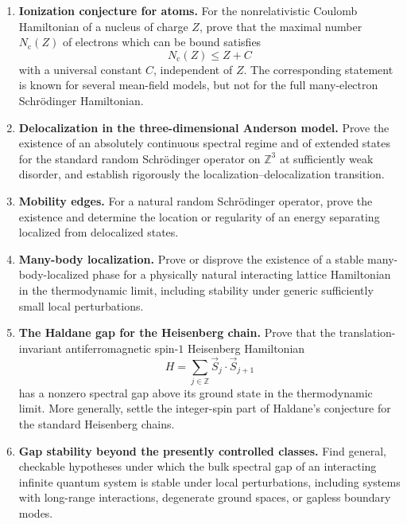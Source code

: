 \documentclass{article}
\begin{document}
\begin{enumerate}[label=\textbf{M\arabic*.},leftmargin=*]

\item \precise{} \textbf{Ionization conjecture for atoms.}
For the nonrelativistic Coulomb Hamiltonian of a nucleus of charge \(Z\),
prove that the maximal number \(N_{\mathrm c}(Z)\) of electrons which can
be bound satisfies
\[
    N_{\mathrm c}(Z)\leq Z+C
\]
with a universal constant \(C\), independent of \(Z\).  The corresponding
statement is known for several mean-field models, but not for the full
many-electron Schrödinger Hamiltonian.

\item \precise{} \textbf{Delocalization in the three-dimensional Anderson model.}
Prove the existence of an absolutely continuous spectral regime and of
extended states for the standard random Schrödinger operator on
\(\mathbb Z^{3}\) at sufficiently weak disorder, and establish rigorously
the localization--delocalization transition.

\item \precise{} \textbf{Mobility edges.}
For a natural random Schrödinger operator, prove the existence and
determine the location or regularity of an energy separating localized
from delocalized states.

\item \precise{} \textbf{Many-body localization.}
Prove or disprove the existence of a stable many-body-localized phase for
a physically natural interacting lattice Hamiltonian in the
thermodynamic limit, including stability under generic sufficiently
small local perturbations.

\item \precise{} \textbf{The Haldane gap for the Heisenberg chain.}
Prove that the translation-invariant antiferromagnetic spin-\(1\)
Heisenberg Hamiltonian
\[
    H=\sum_{j\in\mathbb Z}\vec S_j\cdot\vec S_{j+1}
\]
has a nonzero spectral gap above its ground state in the thermodynamic
limit.  More generally, settle the integer-spin part of Haldane's
conjecture for the standard Heisenberg chains.

\item \precise{} \textbf{Gap stability beyond the presently controlled classes.}
Find general, checkable hypotheses under which the bulk spectral gap of
an interacting infinite quantum system is stable under local
perturbations, including systems with long-range interactions,
degenerate ground spaces, or gapless boundary modes.


\end{enumerate}
\end{document}
